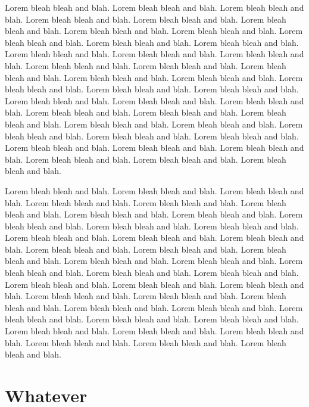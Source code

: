 \documentclass[letterpaper,10pt]{article}
\begin{document}
Lorem bleah bleah and blah. Lorem bleah bleah and blah. Lorem bleah
bleah and blah. Lorem bleah bleah and blah. Lorem bleah bleah and
blah. Lorem bleah bleah and blah. Lorem bleah bleah and blah. Lorem
bleah bleah and blah. Lorem bleah bleah and blah. Lorem bleah bleah
and blah. Lorem bleah bleah and blah. Lorem bleah bleah and blah.
Lorem bleah bleah and blah. Lorem bleah bleah and blah. Lorem bleah
bleah and blah. Lorem bleah bleah and blah. Lorem bleah bleah and
blah. Lorem bleah bleah and blah. Lorem bleah bleah and blah. Lorem
bleah bleah and blah. Lorem bleah bleah and blah. Lorem bleah bleah
and blah. Lorem bleah bleah and blah. Lorem bleah bleah and blah.
Lorem bleah bleah and blah. Lorem bleah bleah and blah. Lorem bleah
bleah and blah. Lorem bleah bleah and blah. Lorem bleah bleah and
blah. Lorem bleah bleah and blah. Lorem bleah bleah and blah. Lorem
bleah bleah and blah. Lorem bleah bleah and blah. Lorem bleah bleah
and blah. Lorem bleah bleah and blah. Lorem bleah bleah and blah.
Lorem bleah bleah and blah. Lorem bleah bleah and blah. Lorem bleah
bleah and blah.

Lorem bleah bleah and blah. Lorem bleah bleah and blah. Lorem bleah
bleah and blah. Lorem bleah bleah and blah. Lorem bleah bleah and
blah. Lorem bleah bleah and blah. Lorem bleah bleah and blah. Lorem
bleah bleah and blah. Lorem bleah bleah and blah. Lorem bleah bleah
and blah. Lorem bleah bleah and blah. Lorem bleah bleah and blah.
Lorem bleah bleah and blah. Lorem bleah bleah and blah. Lorem bleah
bleah and blah. Lorem bleah bleah and blah. Lorem bleah bleah and
blah. Lorem bleah bleah and blah. Lorem bleah bleah and blah. Lorem
bleah bleah and blah. Lorem bleah bleah and blah. Lorem bleah bleah
and blah. Lorem bleah bleah and blah. Lorem bleah bleah and blah.
Lorem bleah bleah and blah. Lorem bleah bleah and blah. Lorem bleah
bleah and blah. Lorem bleah bleah and blah. Lorem bleah bleah and
blah. Lorem bleah bleah and blah. Lorem bleah bleah and blah. Lorem
bleah bleah and blah. Lorem bleah bleah and blah. Lorem bleah bleah
and blah. Lorem bleah bleah and blah. Lorem bleah bleah and blah.
Lorem bleah bleah and blah. Lorem bleah bleah and blah. Lorem bleah
bleah and blah.

\section{Whatever}
\end{document}

